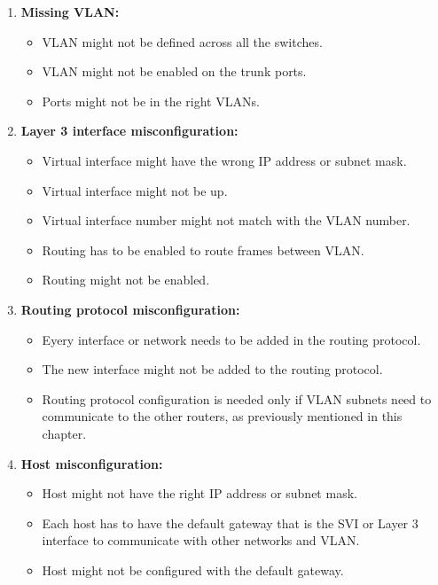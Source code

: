 \begin{enumerate}
    \item \textbf{Missing VLAN:}
    \begin{itemize}
        \item VLAN might not be defined across all the switches.
        \item VLAN might not be enabled on the trunk ports.
        \item Ports might not be in the right VLANs.
    \end{itemize}
    \item \textbf{Layer 3 interface misconfiguration:}
    \begin{itemize}
        \item Virtual interface might have the wrong IP address or subnet mask.
        \item Virtual interface might not be up.
        \item Virtual interface number might not match with the VLAN number.
        \item Routing has to be enabled to route frames between VLAN.
        \item Routing might not be enabled.
    \end{itemize}
    \item \textbf{Routing protocol misconfiguration:}
    \begin{itemize}
        \item Eyery interface or network needs to be added in the routing protocol.
        \item The new interface might not be added to the routing protocol.
        \item Routing protocol configuration is needed only if VLAN subnets need to communicate to the other routers, as previously
        mentioned in this chapter.
    \end{itemize}
    \item \textbf{Host misconfiguration:}
    \begin{itemize}
        \item Host might not have the right IP address or subnet mask.
        \item Each host has to have the default gateway that is the SVI or Layer 3 interface to communicate with other networks and VLAN.
        \item Host might not be configured with the default gateway.
    \end{itemize}
\end{enumerate}